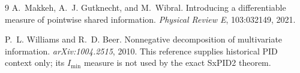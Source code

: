 \documentclass[11pt]{article}
\theoremstyle{definition}
\begin{document}
\begin{thebibliography}{9}
A.~Makkeh, A.~J. Gutknecht, and M.~Wibral.
Introducing a differentiable measure of pointwise shared information.
\emph{Physical Review E}, 103:032149, 2021.

P.~L. Williams and R.~D. Beer.
Nonnegative decomposition of multivariate information.
\emph{arXiv:1004.2515}, 2010.
This reference supplies historical PID context only; its \(I_{\min}\) measure is not used by the
exact SxPID2 theorem.
\end{thebibliography}
\end{document}

